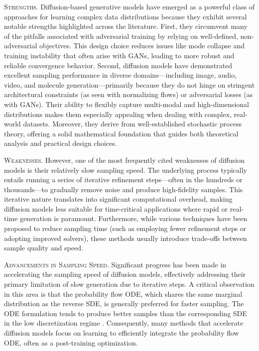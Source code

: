 \textsc{Strengths.} Diffusion-based generative models have emerged as a powerful class of approaches for learning complex data distributions because they exhibit several notable strengths highlighted across the literature. First, they circumvent many of the pitfalls associated with adversarial training by relying on well-defined, non-adversarial objectives. This design choice reduces issues like mode collapse and training instability that often arise with GANs, leading to more robust and reliable convergence behavior. Second, diffusion models have demonstrated excellent sampling performance in diverse domains—including image, audio, video, and molecule generation—primarily because they do not hinge on stringent architectural constraints (as seen with normalizing flows) or adversarial losses (as with GANs). Their ability to flexibly capture multi-modal and high-dimensional distributions makes them especially appealing when dealing with complex, real-world datasets. Moreover, they derive from well-established stochastic process theory, offering a solid mathematical foundation that guides both theoretical analysis and practical design choices.

\textsc{Weaknesses.} However, one of the most frequently cited weaknesses of diffusion models is their relatively slow sampling speed. The underlying process typically entails running a series of iterative refinement steps—often in the hundreds or thousands—to gradually remove noise and produce high-fidelity samples. This iterative nature translates into significant computational overhead, making diffusion models less suitable for time-critical applications where rapid or real-time generation is paramount. Furthermore, while various techniques have been proposed to reduce sampling time (such as employing fewer refinement steps or adopting improved solvers), these methods usually introduce trade-offs between sample quality and speed.

\textsc{Advancements in Sampling Speed.} Significant progress has been made in accelerating the sampling speed of diffusion models, effectively addressing their primary limitation of slow generation due to iterative steps. A critical observation in this area is that the probability flow ODE, which shares the same marginal distribution as the reverse SDE, is generally preferred for faster sampling. The ODE formulation tends to produce better samples than the corresponding SDE in the low discretization regime \cite{song2020score}. Consequently, many methods that accelerate diffusion models focus on learning to efficiently integrate the probability flow ODE, often as a post-training optimization.

